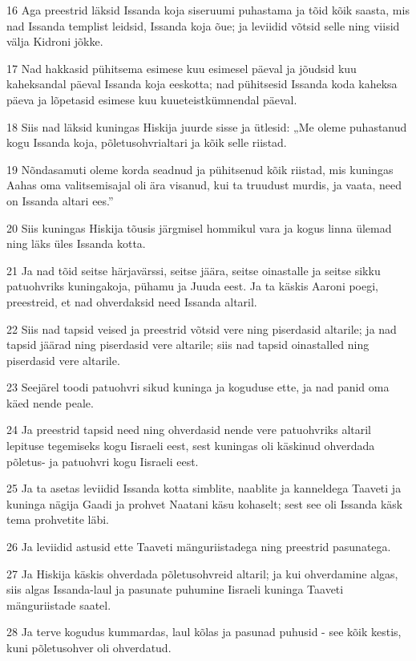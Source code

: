 \par 16 Aga preestrid läksid Issanda koja siseruumi puhastama ja tõid kõik saasta, mis nad Issanda templist leidsid, Issanda koja õue; ja leviidid võtsid selle ning viisid välja Kidroni jõkke.
\par 17 Nad hakkasid pühitsema esimese kuu esimesel päeval ja jõudsid kuu kaheksandal päeval Issanda koja eeskotta; nad pühitsesid Issanda koda kaheksa päeva ja lõpetasid esimese kuu kuueteistkümnendal päeval.
\par 18 Siis nad läksid kuningas Hiskija juurde sisse ja ütlesid: „Me oleme puhastanud kogu Issanda koja, põletusohvrialtari ja kõik selle riistad.
\par 19 Nõndasamuti oleme korda seadnud ja pühitsenud kõik riistad, mis kuningas Aahas oma valitsemisajal oli ära visanud, kui ta truudust murdis, ja vaata, need on Issanda altari ees.”
\par 20 Siis kuningas Hiskija tõusis järgmisel hommikul vara ja kogus linna ülemad ning läks üles Issanda kotta.
\par 21 Ja nad tõid seitse härjavärssi, seitse jäära, seitse oinastalle ja seitse sikku patuohvriks kuningakoja, pühamu ja Juuda eest. Ja ta käskis Aaroni poegi, preestreid, et nad ohverdaksid need Issanda altaril.
\par 22 Siis nad tapsid veised ja preestrid võtsid vere ning piserdasid altarile; ja nad tapsid jäärad ning piserdasid vere altarile; siis nad tapsid oinastalled ning piserdasid vere altarile.
\par 23 Seejärel toodi patuohvri sikud kuninga ja koguduse ette, ja nad panid oma käed nende peale.
\par 24 Ja preestrid tapsid need ning ohverdasid nende vere patuohvriks altaril lepituse tegemiseks kogu Iisraeli eest, sest kuningas oli käskinud ohverdada põletus- ja patuohvri kogu Iisraeli eest.
\par 25 Ja ta asetas leviidid Issanda kotta simblite, naablite ja kanneldega Taaveti ja kuninga nägija Gaadi ja prohvet Naatani käsu kohaselt; sest see oli Issanda käsk tema prohvetite läbi.
\par 26 Ja leviidid astusid ette Taaveti mänguriistadega ning preestrid pasunatega.
\par 27 Ja Hiskija käskis ohverdada põletusohvreid altaril; ja kui ohverdamine algas, siis algas Issanda-laul ja pasunate puhumine Iisraeli kuninga Taaveti mänguriistade saatel.
\par 28 Ja terve kogudus kummardas, laul kõlas ja pasunad puhusid - see kõik kestis, kuni põletusohver oli ohverdatud.

